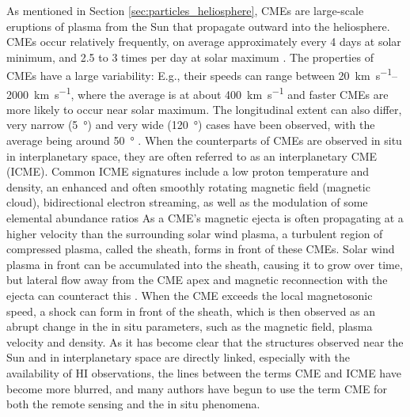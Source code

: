 As mentioned in Section \ref{sec:particles_heliosphere}, \acp{CME} are large-scale eruptions of plasma from the Sun that propagate outward into the heliosphere. CMEs occur relatively frequently, on average approximately every 4 days at solar minimum, and 2.5 to 3 times per day at solar maximum \citep{Webb-1994}. The properties of CMEs have a large variability: E.g., their speeds can range between \SIrange[range-phrase={\,and\,}]{20}{2000}{\kilo\meter\per\second}, where the average is at about \SI{400}{\kilo\meter\per\second} and faster CMEs are more likely to occur near solar maximum. The longitudinal extent can also differ, very narrow (\SI{5}{\degree}) and very wide (\SI{120}{\degree}) cases have been observed, with the average being around \SI{50}{\degree} \citep{Cane-2000}.
When the counterparts of \acp{CME} are observed in situ in interplanetary space, they are often referred to as an interplanetary \ac{CME} (\acs{ICME}). Common \ac{ICME} signatures include a low proton temperature and density, an enhanced and often smoothly rotating magnetic field (magnetic cloud), bidirectional electron streaming, as well as the modulation of some elemental abundance ratios \citep{Richardson-Cane-1995,Zurbuchen-2006-insitu-signatures,Wimmer-Schweingruber2006}
As a \ac{CME}'s magnetic ejecta is often propagating at a higher velocity than the surrounding solar wind plasma, a turbulent region of compressed plasma, called the sheath, forms in front of these \acp{CME}. Solar wind plasma in front can be accumulated into the sheath, causing it to grow over time, but lateral flow away from the CME apex and magnetic reconnection with the ejecta can counteract this \citep[see e.g.]{Janvier-2019,Siscoe2008,Manchester2005}. When the \ac{CME} exceeds the local magnetosonic speed, a shock can form in front of the sheath, which is then observed as an abrupt change in the in situ parameters, such as the magnetic field, plasma velocity and density.
As it has become clear that the structures observed near the Sun and in interplanetary space are directly linked, especially with the availability of \ac{HI} observations, the lines between the terms \ac{CME} and \ac{ICME} have become more blurred, and many authors have begun to use the term \ac{CME} for both the remote sensing and the in situ phenomena.



